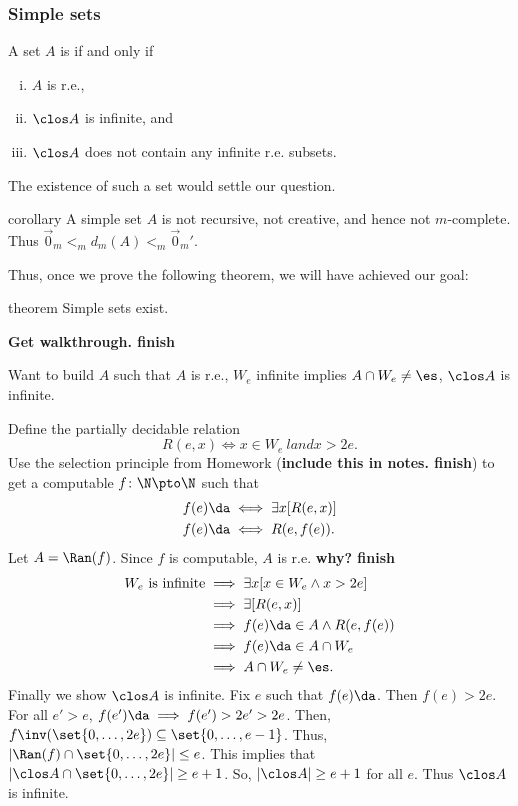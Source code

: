 \documentclass[class=article, crop=false]{standalone}
\begin{document}
\subsubsection{Simple sets}

\begin{defn}
  A set $A$ is  if and only if
    \begin{enumerate}[(i)]
      \item $A$ is r.e.,
      \item $\clos A$ is infinite, and
      \item $\clos A$ does not contain any infinite r.e. subsets.
    \end{enumerate}
\end{defn}
\begin{rem}
  The existence of such a set would settle our question.
\end{rem}

\begin{result}{corollary}
  A simple set $A$ is not recursive, not creative, and hence not $m$-complete. Thus $\vec 0_m <_m d_m(A) <_m \vec 0_m'$.
\end{result}

Thus, once we prove the following theorem, we will have achieved our goal:

\begin{result}{theorem}
  Simple sets exist.
\end{result}
\begin{pf}
  \textbf{Get walkthrough. finish}

  Want to build $A$ such that $A$ is r.e., $W_e$ infinite implies $A \cap W_e \neq \es$, $\clos A$ is infinite.

  Define the partially decidable relation
    \[
      R(e,x) \iff x\in W_e\ land x > 2e.
    \]
  Use the selection principle from Homework (\textbf{include this in notes. finish}) to get a computable $f\colon \N \pto \N$ such that
    \begin{align*}
      f(e) \da &\iff \exists x [R(e,x)] \\
      f(e) \da &\iff R(e,f(e)).
    \end{align*}
  Let $A = \Ran(f)$. Since $f$ is computable, $A$ is r.e. \textbf{why? finish}
    \begin{align*}
      W_e \text{ is infinite} &\implies \exists x [x \in W_e \land x > 2e] \\
        &\implies \exists [R(e,x)] \\
        &\implies f(e) \da \in A \land R(e,f(e)) \\
        &\implies f(e) \da \in A \cap W_e \\
        &\implies A \cap W_e \neq \es.
    \end{align*}
  Finally we show $\clos A$ is infinite. Fix $e$ such that $f(e) \da$. Then $f(e) > 2e$. For all $e' > e$, $f(e') \da \implies f(e') > 2e' > 2e$. Then, $f\inv(\set{0,\ldots,2e}) \subseteq \set{0,\ldots,e-1}$. Thus, $|\Ran(f) \cap \set{0,\ldots,2e}| \leq e$.
  This implies that $|\clos A \cap \set{0,\ldots,2e}| \geq e+1$. So, $|\clos A| \geq e+1$ for all $e$. Thus $\clos A$ is infinite.
\end{pf}
\end{document}
